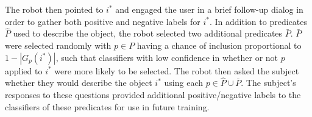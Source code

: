The robot then pointed to $i^*$ and engaged the user in a brief follow-up dialog in order to gather both positive and negative labels for $i^*$.
In addition to predicates $\hat{P}$ used to describe the object, the robot selected two additional predicates $\bar{P}$.
$\bar{P}$ were selected randomly with $p\in P$ having a chance of inclusion proportional to $1-|G_p(i^*)|$, such that classifiers with low confidence in whether or not $p$ applied to $i^*$ were more likely to be selected.
The robot then asked the subject whether they would describe the object $i^*$ using each $p\in\hat{P}\cup\bar{P}$.
The subject's responses to these questions provided additional positive/negative labels to the classifiers of these predicates for use in future training.
